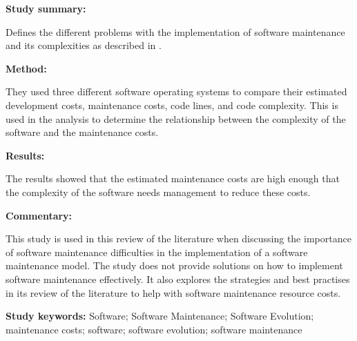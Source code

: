 \begin{tcolorbox}[colback=gray!5!white, colframe=pastelgreen!40!black, title=On the Relationship between Software Complexity and Maintenance Costs\cite{Ogheneovo2014}]
	\begin{minipage}[t]{0.25\textwidth}
		\textbf{Study summary:}
	\end{minipage}
	\hfill
	\begin{minipage}[t]{0.65\textwidth}
		Defines the different problems with the implementation of software maintenance and its complexities
as described in . 
	\end{minipage}

	\vspace{0.75em} 

	\begin{minipage}[t]{0.25\textwidth}
		\textbf{Method:}
	\end{minipage}
	\hfill
	\begin{minipage}[t]{0.65\textwidth}
		They used three different software operating systems to compare their estimated development costs, maintenance costs, code lines, and code complexity. This is used in the analysis to determine the relationship between the complexity of the software and the maintenance costs.
	\end{minipage}

	\vspace{0.75em} 

	\begin{minipage}[t]{0.25\textwidth}
		\textbf{Results:}
	\end{minipage}
	\hfill
	\begin{minipage}[t]{0.65\textwidth}
		The results showed that the estimated maintenance costs are high enough that the complexity of the software needs management to reduce these costs.
	\end{minipage}

	\vspace{0.75em} 

	\begin{minipage}[t]{0.25\textwidth}
		\textbf{Commentary:}
	\end{minipage}
	\hfill
	\begin{minipage}[t]{0.65\textwidth}
		This study is used in this review of the literature when discussing the importance of software
maintenance difficulties in the implementation of a software maintenance model. The study does not
provide solutions on how to implement software maintenance effectively. It also explores the strategies and best
practises in its review of the literature to help with software maintenance resource costs.
	\end{minipage}
	\tcblower
	\textbf{Study keywords:} Software; Software Maintenance; Software Evolution; maintenance costs;
	software; software evolution; software maintenance
\end{tcolorbox}

